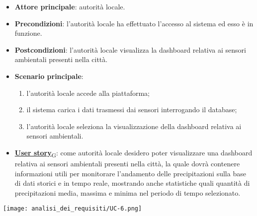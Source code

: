 \begin{itemize}
	\item \textbf{Attore principale}: autorità locale.
	\item \textbf{Precondizioni}: l'autorità locale ha effettuato l'accesso al sistema ed esso è in funzione.
	\item \textbf{Postcondizioni}: l'autorità locale visualizza la dashboard relativa
	      ai sensori ambientali presenti nella città.
	\item \textbf{Scenario principale}:
	      \begin{enumerate}
		      \item l'autorità locale accede alla piattaforma;
		      \item il sistema carica i dati trasmessi dai sensori interrogando il database;
		      \item l'autorità locale seleziona la visualizzazione della dashboard relativa ai sensori ambientali.
	      \end{enumerate}
	\item \href{https://7last.github.io/docs/rtb/documentazione-interna/glossario\#user-story}{\textbf{User story}\textsubscript{G}}:
	      come autorità locale desidero poter visualizzare una dashboard relativa ai sensori ambientali presenti nella città, la quale
	      dovrà contenere informazioni utili per monitorare l'andamento delle precipitazioni sulla base di dati storici e in tempo reale, mostrando
	      anche statistiche quali quantità di precipitazioni media, massima e minima nel periodo di tempo selezionato.
\end{itemize}
\begin{center}
	\texttt{[image: analisi\_dei\_requisiti/UC-6.png]}
\end{center}


